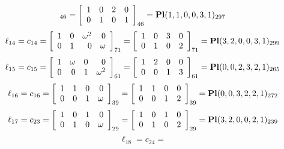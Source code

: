 \documentclass{article}
\begin{document}
{$$_{46}
=
\left[
\begin{array}{*{4}c}
1  & 0  & 2  & 0\\
0  & 1  & 0  & 1\\
\end{array}
\right]_{46}
={\rm\bf Pl}(1,1,0,0,3,1 )_{297}$$
$$
\ell_{14} = c_{14} = 
\left[
\begin{array}{*{4}{r}}
1 & 0 & \omega^{2} & 0\\
0 & 1 & 0 & \omega \\
\end{array}
\right]
_{71}
=
\left[
\begin{array}{*{4}c}
1  & 0  & 3  & 0\\
0  & 1  & 0  & 2\\
\end{array}
\right]_{71}
={\rm\bf Pl}(3,2,0,0,3,1 )_{299}$$
$$
\ell_{15} = c_{15} = 
\left[
\begin{array}{*{4}{r}}
1 & \omega  & 0 & 0\\
0 & 0 & 1 & \omega^{2}\\
\end{array}
\right]
_{61}
=
\left[
\begin{array}{*{4}c}
1  & 2  & 0  & 0\\
0  & 0  & 1  & 3\\
\end{array}
\right]_{61}
={\rm\bf Pl}(0,0,2,3,2,1 )_{265}$$
$$
\ell_{16} = c_{16} = 
\left[
\begin{array}{*{4}{r}}
1 & 1 & 0 & 0\\
0 & 0 & 1 & \omega \\
\end{array}
\right]
_{39}
=
\left[
\begin{array}{*{4}c}
1  & 1  & 0  & 0\\
0  & 0  & 1  & 2\\
\end{array}
\right]_{39}
={\rm\bf Pl}(0,0,3,2,2,1 )_{272}$$
$$
\ell_{17} = c_{23} = 
\left[
\begin{array}{*{4}{r}}
1 & 0 & 1 & 0\\
0 & 1 & 0 & \omega \\
\end{array}
\right]
_{29}
=
\left[
\begin{array}{*{4}c}
1  & 0  & 1  & 0\\
0  & 1  & 0  & 2\\
\end{array}
\right]_{29}
={\rm\bf Pl}(3,2,0,0,2,1 )_{239}$$
$$
\ell_{18} = c_{24} = 
$$}
\end{document}
